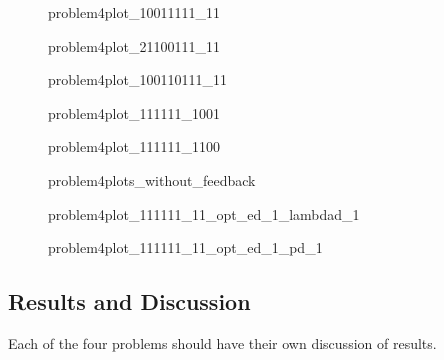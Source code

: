 \begin{figure}[htbp]
	\centering
	\caption{problem4plot\_10011111\_11}
	\label{fig:problem4plot_10011111_11}%
\end{figure}

\begin{figure}[htbp]
	\centering
	\caption{problem4plot\_21100111\_11}
	\label{fig:problem4plot_21100111_11}%
\end{figure}

\begin{figure}[htbp]
	\centering
	\caption{problem4plot\_100110111\_11}
	\label{fig:problem4plot_100110111_11}%
\end{figure}

\begin{figure}[htbp]
	\centering
	\caption{problem4plot\_111111\_1001}
	\label{fig:problem4plot_111111_1001}%
\end{figure}

\begin{figure}[htbp]
	\centering
	\caption{problem4plot\_111111\_1100}
	\label{fig:problem4plot_111111_1100}%
\end{figure}

\begin{figure}[htbp]
	\centering
	\caption{problem4plots\_without\_feedback}
	\label{fig:problem4plots_without_feedback}%
\end{figure}

\begin{figure}[htbp]
	\centering
	\caption{problem4plot\_111111\_11\_opt\_ed\_1\_lambdad\_1}
	\label{fig:problem4plot_111111_11_opt_ed_1_lambdad_1}%
\end{figure}

\begin{figure}[htbp]
	\centering
	\caption{problem4plot\_111111\_11\_opt\_ed\_1\_pd\_1}
	\label{fig:problem4plot_111111_11_opt_ed_1_pd_1}%
\end{figure}




\subsection{Results and Discussion}
Each of the four problems should have their own discussion of results. 

